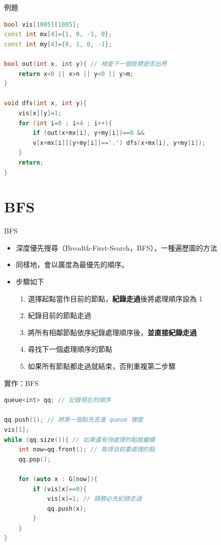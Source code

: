 \documentclass[mathserif]{beamer}
\begin{document}
\begin{frame}[fragile]{例題}
\begin{lstlisting}[language=C++, caption={}]
bool vis[1005][1005];
const int mx[4]={1, 0, -1, 0};
const int my[4]={0, 1, 0, -1};

bool out(int x, int y){ // 檢查下一個座標是否出界
    return x<0 || x>n || y<0 || y>m;
}

void dfs(int x, int y){
    vis[x][y]=1;
    for (int i=0 ; i<4 ; i++){
        if (out(x+mx[i], y+my[i])==0 &&
        v[x+mx[i]][y+my[i]]=='.') dfs(x+mx[i], y+my[i]);
    }
    return;
}
\end{lstlisting}
\end{frame}

\section{BFS}

\begin{frame}{BFS}
    \begin{itemize}
        \item 深度優先搜尋（Breadth-First-Search，BFS），一種遍歷圖的方法
        \item 同樣地，會以廣度為最優先的順序。
        \item 步驟如下
            \begin{enumerate}
                \itemsep=5pt
                \item 選擇起點當作目前的節點，\textbf{紀錄走過}後將處理順序設為 1
                \item 紀錄目前的節點走過
                \item 將所有相鄰節點依序紀錄處理順序後，\textbf{並直接紀錄走過}
                \item 尋找下一個處理順序的節點
                \item 如果所有節點都走過就結束，否則重複第二步驟
            \end{enumerate}
    \end{itemize}
\end{frame}

\begin{frame}[fragile]{實作：BFS}
\begin{lstlisting}[language=C++, caption={}]
queue<int> qq; // 記錄現在的順序

qq.push(1); // 將第一個點先丟進 queue 裡面
vis[1];
while (qq.size()){ // 如果還有待處理的點就繼續
    int now=qq.front(); // 取得目前要處理的點
    qq.pop();

    for (auto x : G[now]){
        if (vis[x]==0){
            vis[x]=1; // 請務必先紀錄走過
            qq.push(x);
        }
    }
}

\end{lstlisting}
\end{frame}
\end{document}
